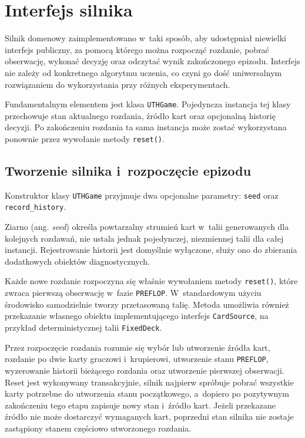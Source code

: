 \section{Interfejs silnika}
\label{sec:interfejs-silnika}

Silnik domenowy zaimplementowano w~taki sposób, aby udostępniał niewielki interfejs publiczny, za pomocą którego
można rozpocząć rozdanie, pobrać obserwację, wykonać decyzję oraz odczytać wynik
zakończonego epizodu. Interfejs nie zależy od konkretnego algorytmu
uczenia, co czyni go dość uniwersalnym rozwiązaniem do wykorzystania przy różnych eksperymentach.

Fundamentalnym elementem jest klasa \texttt{UTHGame}. Pojedyncza instancja tej klasy
przechowuje stan aktualnego rozdania, źródło kart oraz opcjonalną historię
decyzji. Po zakończeniu rozdania ta sama instancja może zostać wykorzystana
ponownie przez wywołanie metody \texttt{reset()}.

\subsection{Tworzenie silnika i~rozpoczęcie epizodu}
\label{subsec:tworzenie-silnika}

Konstruktor klasy \texttt{UTHGame} przyjmuje dwa opcjonalne parametry:
\texttt{seed} oraz \texttt{record\_history}.

Ziarno (ang. \emph{seed}) określa powtarzalny strumień
kart w~talii generowanych dla kolejnych rozdawań, nie ustala jednak pojedynczej,
niezmiennej talii dla całej instancji. Rejestrowanie historii jest
domyślnie wyłączone, służy ono do zbierania dodatkowych obiektów diagnostycznych.

Każde nowe rozdanie rozpoczyna się właśnie wywołaniem metody \texttt{reset()}, które zwraca pierwszą obserwację
w~fazie \texttt{PREFLOP}. W~standardowym użyciu środowisko samodzielnie
tworzy przetasowaną talię. Metoda umożliwia również przekazanie własnego
obiektu implementującego interfejs \texttt{CardSource}, na przykład
deterministycznej talii \texttt{FixedDeck}.

Przez rozpoczęcie rozdania rozumie się wybór lub utworzenie źródła kart, rozdanie po
dwie karty graczowi i~krupierowi, utworzenie stanu \texttt{PREFLOP},
wyzerowanie historii bieżącego rozdania oraz utworzenie pierwszej obserwacji.
Reset jest wykonywany transakcyjnie, silnik najpierw spróbuje pobrać wszystkie
karty potrzebne do utworzenia stanu początkowego, a~dopiero po pozytywnym zakończeniu tego etapu
zapisuje nowy stan i~źródło kart. Jeżeli przekazane źródło nie może dostarczyć
wymaganych kart, poprzedni stan silnika nie zostaje zastąpiony stanem
częściowo utworzonego rozdania.


